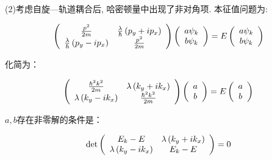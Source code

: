 \begin{enumerate}
(2)考虑自旋---轨道耦合后, 哈密顿量中出现了非对角项. 本征值问题为:


\begin{equation*}
\left( {\begin{array}{*{20}c}
   {\frac{p^2}{2m}} & {\frac{\lambda}{\hbar}\left( p_y + i p_x \right)}  \\
   { \frac{\lambda}{\hbar}\left( p_y - i p_x \right) } & {\frac{p^2}{2m}}  \\
 \end{array} } \right)
\left( {\begin{array}{*{20}c}
   {a \psi_k}  \\
   {b \psi_k}  \\
 \end{array} } \right)
= E \left( {\begin{array}{*{20}c}
   {a \psi_k}  \\
   {b \psi_k}  \\
 \end{array} } \right)
\end{equation*}

化简为：

\begin{equation}\label{spin_orbital}
\left( {\begin{array}{*{20}c}
   { \frac{\hbar^2 k^2}{2m} } & { \lambda \left( k_y + i k_x \right)  }  \\
   { \lambda \left( k_y - i k_x  \right) } & { \frac{\hbar^2 k^2}{2m}   }  \\
 \end{array} } \right)
\left( {\begin{array}{*{20}c}
   {a }  \\
   {b }  \\
 \end{array} } \right)
= E \left( {\begin{array}{*{20}c}
   {a }  \\
   {b }  \\
 \end{array} } \right)
\end{equation}

$a, b$存在非零解的条件是：

\begin{equation*}
\det \left( {\begin{array}{*{20}c}
   {E_k - E} & {\lambda \left( k_y + i k_x \right)}  \\
   {\lambda \left( k_y - i k_x  \right)} & {E_k - E}  \\
 \end{array} } \right) = 0
\end{equation*}


\end{enumerate}
